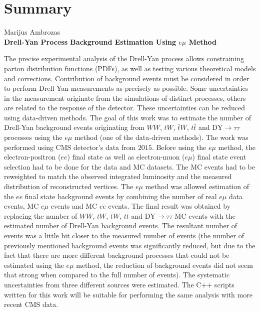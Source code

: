 \documentclass[a4paper, 12pt]{article}
\newcommand{\WW}{W\! W}
\newcommand{\DYtau}{\mathrm{DY} \! \rightarrow \! \tau\tau}
\begin{document}
\clearpage
\section*{Summary}
\begin{centering}
Marijus Ambrozas\\
\textbf{Drell-Yan Process Background Estimation Using $e\mu$ Method}\\
\end{centering}
\vspace{0.5cm}
The precise experimental analysis of the Drell-Yan process allows constraining parton distribution functions (PDFs), as well as testing various theoretical models and corrections. Contribution of background events must be considered in order to perform Drell-Yan measurements as precisely as possible. Some uncertainties in the measurement originate from the simulations of distinct processes, others are related to the response of the detector. These uncertainties can be reduced using data-driven methods. The goal of this work was to estimate the number of Drell-Yan background events originating from $\WW$, $tW$, $\bar{t}W$, $t\bar{t}$ and $\DYtau$ processes using the $e\mu$ method (one of the data-driven methods). The work was performed using CMS detector's data from $2015$. Before using the $e\mu$ method, the electron-positron ($ee$) final state as well as electron-muon ($e\mu$) final state event selection had to be done for the data and MC datasets. The MC events had to be reweighted to match the observed integrated luminosity and the measured distribution of reconstructed vertices. The $e\mu$ method was allowed estimation of the $ee$ final state background events by combining the number of real $e\mu$ data events, MC $e\mu$ events and MC $ee$ events. The final result was obtained by replacing the number of $\WW$, $tW$, $\bar{t}W$, $t\bar{t}$ and $\DYtau$ MC events with the estimated number of Drell-Yan background events. The resultant number of events was a little bit closer to the measured number of events (the number of previously mentioned background events was significantly reduced, but due to the fact that there are more different background processes that could not be estimated using the $e\mu$ method, the reduction of background events did not seem that strong when compared to the full number of events). The systematic uncertainties from three different sources were estimated. The C++ scripts written for this work will be suitable for performing the same analysis with more recent CMS data.
\end{document}
